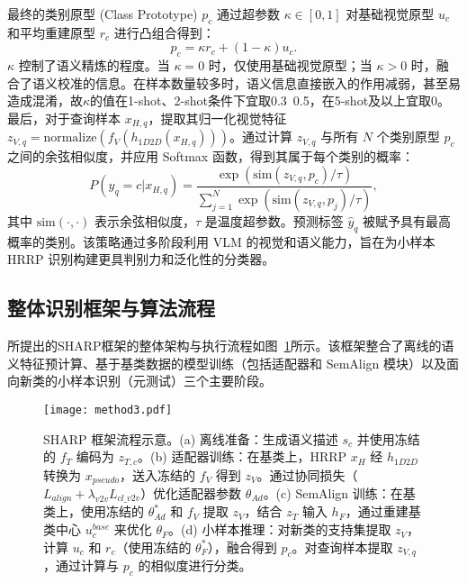 最终的类别原型 (Class Prototype) $p_c$ 通过超参数 $\kappa \in [0, 1]$ 对基础视觉原型 $u_c$ 和平均重建原型 $r_c$ 进行凸组合得到： 
\begin{equation} p_c = \kappa r_c + (1 - \kappa) u_c. \label{eq:semantic_fusion_prototype} \end{equation} 
$\kappa$ 控制了语义精炼的程度。当 $\kappa=0$ 时，仅使用基础视觉原型；当 $\kappa>0$ 时，融合了语义校准的信息。在样本数量较多时，语义信息直接嵌入的作用减弱，甚至易造成混淆，故$\kappa$的值在1-shot、2-shot条件下宜取0.3~0.5，在5-shot及以上宜取0。最后，对于查询样本 $x_{H,q}$，提取其归一化视觉特征 $z_{V,q} = \text{normalize}(f_V(h_{1D2D}(x_{H,q})))$。通过计算 $z_{V,q}$ 与所有 $N$ 个类别原型 $p_c$ 之间的余弦相似度，并应用 Softmax 函数，得到其属于每个类别的概率： 
\begin{equation} P(y_q = c | x_{H,q}) = \frac{\exp(\text{sim}(z_{V,q}, p_c) / \tau)}{\sum_{j=1}^{N} \exp(\text{sim}(z_{V,q}, p_j) / \tau)}, \label{eq:classification_semantic} \end{equation} 
其中 $\text{sim}(\cdot, \cdot)$ 表示余弦相似度，$\tau$ 是温度超参数。预测标签 $\hat{y}_q$ 被赋予具有最高概率的类别。该策略通过多阶段利用 VLM 的视觉和语义能力，旨在为小样本 HRRP 识别构建更具判别力和泛化性的分类器。

\subsection{整体识别框架与算法流程} \label{subsec:overall_framework_semantic} 所提出的SHARP框架的整体架构与执行流程如图~\ref{fig:sharp_framework}所示。该框架整合了离线的语义特征预计算、基于基类数据的模型训练（包括适配器和 SemAlign 模块）以及面向新类的小样本识别（元测试）三个主要阶段。 

\begin{figure}[h!] \centering %
\texttt{[image: method3.pdf]} 
\caption{SHARP 框架流程示意。(a) 离线准备：生成语义描述 $s_c$ 并使用冻结的 $f_T$ 编码为 $z_{T,c}$。(b) 适配器训练：在基类上，HRRP $x_H$ 经 $h_{1D2D}$ 转换为 $x_{pseudo}$，送入冻结的 $f_V$ 得到 $z_V$。通过协同损失（$L_{align} + \lambda_{v2v} L_{cl\_v2v}$）优化适配器参数 $\theta_{Ad}$。(c) SemAlign 训练：在基类上，使用冻结的 $\theta_{Ad}^*$ 和 $f_V$ 提取 $z_V$，结合 $z_T$ 输入 $h_F$，通过重建基类中心 $u_c^{base}$ 来优化 $\theta_F$。(d) 小样本推理：对新类的支持集提取 $z_V$，计算 $u_c$ 和 $r_c$（使用冻结的 $\theta_F^*$），融合得到 $p_c$。对查询样本提取 $z_{V,q}$，通过计算与 $p_c$ 的相似度进行分类。} \label{fig:sharp_framework} %
\end{figure} 

